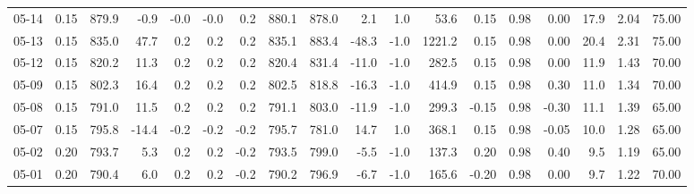 \begin{threeparttable}
{\begin{tabular}{lrrrrrrrrrrrrrrrrr}
  05-14 &     0.15 & 879.9 &              -0.9 &              -0.0 &               -0.0 &                0.2 & 880.1 & 878.0 &        2.1 &                      1.0 &                53.6 &       0.15 &      0.98 &           0.00 &             17.9 &            2.04 &                  75.00 \\
  05-13 &     0.15 & 835.0 &              47.7 &               0.2 &                0.2 &                0.2 & 835.1 & 883.4 &      -48.3 &                     -1.0 &              1221.2 &       0.15 &      0.98 &           0.00 &             20.4 &            2.31 &                  75.00 \\
  05-12 &     0.15 & 820.2 &              11.3 &               0.2 &                0.2 &                0.2 & 820.4 & 831.4 &      -11.0 &                     -1.0 &               282.5 &       0.15 &      0.98 &           0.00 &             11.9 &            1.43 &                  70.00 \\
  05-09 &     0.15 & 802.3 &              16.4 &               0.2 &                0.2 &                0.2 & 802.5 & 818.8 &      -16.3 &                     -1.0 &               414.9 &       0.15 &      0.98 &           0.30 &             11.0 &            1.34 &                  70.00 \\
  05-08 &     0.15 & 791.0 &              11.5 &               0.2 &                0.2 &                0.2 & 791.1 & 803.0 &      -11.9 &                     -1.0 &               299.3 &      -0.15 &      0.98 &          -0.30 &             11.1 &            1.39 &                  65.00 \\
  05-07 &     0.15 & 795.8 &             -14.4 &              -0.2 &               -0.2 &               -0.2 & 795.7 & 781.0 &       14.7 &                      1.0 &               368.1 &       0.15 &      0.98 &          -0.05 &             10.0 &            1.28 &                  65.00 \\
  05-02 &     0.20 & 793.7 &               5.3 &               0.2 &                0.2 &               -0.2 & 793.5 & 799.0 &       -5.5 &                     -1.0 &               137.3 &       0.20 &      0.98 &           0.40 &              9.5 &            1.19 &                  65.00 \\
  05-01 &     0.20 & 790.4 &               6.0 &               0.2 &                0.2 &               -0.2 & 790.2 & 796.9 &       -6.7 &                     -1.0 &               165.6 &      -0.20 &      0.98 &           0.00 &              9.7 &            1.22 &                  70.00 \\

\end{tabular}}
\end{threeparttable}
